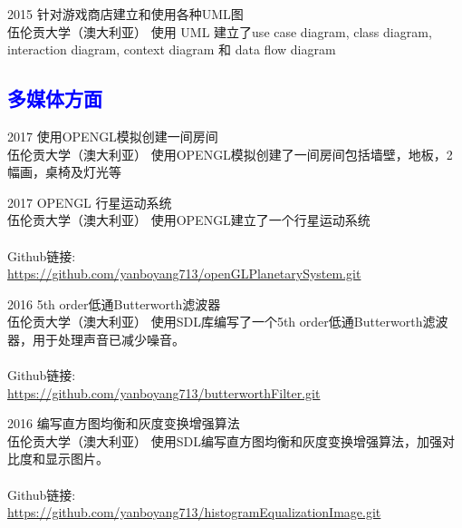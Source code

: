\documentclass[]{friggeri-cv}
\begin{document}
\begin{entrylist}
  \entry
    {2015}
    {针对游戏商店建立和使用各种UML图\\}
    {伍伦贡大学（澳大利亚）}
    {使用 UML 建立了use case diagram, class diagram, interaction diagram, context diagram 和 data flow diagram}
\end{entrylist}

\subsection*{\textcolor{blue}{多媒体方面}}
\begin{entrylist}
  \entry
    {2017}
    {使用OPENGL模拟创建一间房间\\}
    {伍伦贡大学（澳大利亚）}
    {使用OPENGL模拟创建了一间房间包括墙壁，地板，2幅画，桌椅及灯光等}
\end{entrylist}

\begin{entrylist}
  \entry
    {2017}
    {OPENGL 行星运动系统\\}
    {伍伦贡大学（澳大利亚）}
    {使用OPENGL建立了一个行星运动系统
    \\\\ Github链接: \\{\small\url{https://github.com/yanboyang713/openGLPlanetarySystem.git}}}
\end{entrylist}

\begin{entrylist}
  \entry
    {2016}
    {5th order低通Butterworth滤波器\\}
    {伍伦贡大学（澳大利亚）}
    {使用SDL库编写了一个5th order低通Butterworth滤波器，用于处理声音已减少噪音。 
     \\\\ Github链接: \\{\small\url{https://github.com/yanboyang713/butterworthFilter.git}}}
\end{entrylist}

\begin{entrylist}
  \entry
    {2016}
    {编写直方图均衡和灰度变换增强算法\\}
    {伍伦贡大学（澳大利亚）}
    {使用SDL编写直方图均衡和灰度变换增强算法，加强对比度和显示图片。
     \\\\ Github链接: \\{\small\url{https://github.com/yanboyang713/histogramEqualizationImage.git}}}
\end{entrylist}
\end{document}
